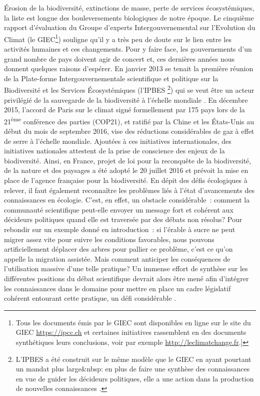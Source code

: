 Érosion de la biodiversité, extinctions de masse, perte de services
écosystémiques, la liste est longue des bouleversements biologiques de
notre époque. Le cinquième rapport d'évaluation du Groupe d'experts
Intergouvernemental sur l'Evolution du Climat (le GIEC\footnote{Tous les
  documents émis par le GIEC sont disponibles en ligne sur le site du
  GIEC \url{https://ipcc.ch} et certaines initiatives rassemblent en des
  documents synthétiques leurs conclusions, voir par exemple
  \url{http://leclimatchange.fr}.{]}}) souligne qu'il y a très peu de
doute sur le lien entre les activités humaines et ces changements. Pour
y faire face, les gouvernements d'un grand nombre de pays doivent agir
de concert et, ces dernières années nous donnent quelques raisons
d'espérer. En janvier 2013 se tenait la première réunion de la
Plate-forme Intergouvernementale scientifique et politique sur la
Biodiversité et les Services Écosystémiques (l'IPBES \footnote{L'IPBES a
  été construit sur le même modèle que le GIEC en ayant pourtant un
  mandat plus large\&nbsp: en plus de faire une synthèse des
  connaissances en vue de guider les décideurs politiques, elle a une
  action dans la production de nouvelles connaissances
  \citep{Brooks2014}.}) qui se veut être un acteur privilégié de la
sauvegarde de la biodiversité à l'échelle mondiale \citep{Diaz2015a}. En
décembre 2015, l'accord de Paris sur le climat signé formellement par
175 pays lors de la 21\textsuperscript{ème} conférence des parties
(COP21), et ratifié par la Chine et les États-Unis au début du mois de
septembre 2016, vise des réductions considérables de gaz à effet de
serre à l'échelle mondiale. Ajoutées à ces initiatives internationales,
des initiatives nationales attestent de la prise de conscience des
enjeux de la biodiversité. Ainsi, en France, projet de loi pour la
reconquête de la biodiversité, de la nature et des paysages a été adopté
le 20 juillet 2016 et prévoit la mise en place de l'agence française
pour la biodiversité. En dépit des défis écologiques à relever, il faut
également reconnaître les problèmes liés à l'état d'avancements des
connaissances en écologie. C'est, en effet, un obstacle considérable~:
comment la communauté scientifique peut-elle envoyer un message fort et
cohérent aux décideurs politiques quand elle est traversée par des
débats non résolus? Pour rebondir sur un exemple donné en introduction~:
si l'érable à sucre ne peut migrer assez vite pour suivre les conditions
favorables, nous pouvons artificiellement déplacer des arbres pour
pallier ce problème, c'est ce qu'on appelle la migration assistée. Mais
comment anticiper les conséquences de l'utilisation massive d'une telle
pratique? Un immense effort de synthèse sur les différentes positions du
débat scientifique devrait alors être mené afin d'intégrer les
connaissances dans le domaine pour mettre en place un cadre législatif
cohérent entourant cette pratique, un défi considérable
\citep{McLachlan2007}.

